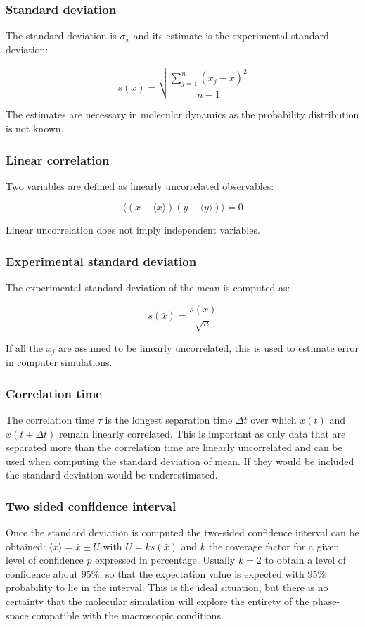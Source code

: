 		\subsubsection{Standard deviation}
		The standard deviation is $\sigma_x$ and its estimate is the experimental standard deviation:

		$$s(x) = \sqrt{\frac{\sum\limits_{j=1}^n(x_j-\bar{x})^2}{n-1}}$$

		The estimates are necessary in molecular dynamics as the probability distribution is not known.

		\subsubsection{Linear correlation}
		Two variables are defined as linearly uncorrelated observables:

		$$\bigl\langle(x-\langle x\rangle)(y-\langle y\rangle)\bigr\rangle = 0$$

		Linear uncorrelation does not imply independent variables.

		\subsubsection{Experimental standard deviation}
		The experimental standard deviation of the mean is computed as:

		$$s(\bar{x}) = \frac{s(x)}{\sqrt{n}}$$

		If all the $x_j$ are assumed to be linearly uncorrelated, this is used to estimate error in computer simulations.

		\subsubsection{Correlation time}
		The correlation time $\tau$ is the longest separation time $\Delta t$ over which $x(t)$ and $x(t + \Delta t)$ remain linearly correlated.
		This is important as only data that are separated more than the correlation time are linearly uncorrelated and can be used when computing the standard deviation of mean.
		If they would be included the standard deviation would be underestimated.

		\subsubsection{Two sided confidence interval}
		Once the standard deviation is computed the two-sided confidence interval can be obtained: $\langle x\rangle = \bar{x} \pm U$ with $U = ks(\bar{x})$ and $k$ the coverage factor for a given level of confidence $p$ expressed in percentage.
		Usually $k=2$ to obtain a level of confidence about $95\%$, so that the expectation value is expected with $95\%$ probability to lie in the interval.
		This is the ideal situation, but there is no certainty that the molecular simulation will explore the entirety of the phase-space compatible with the macroscopic conditions.

